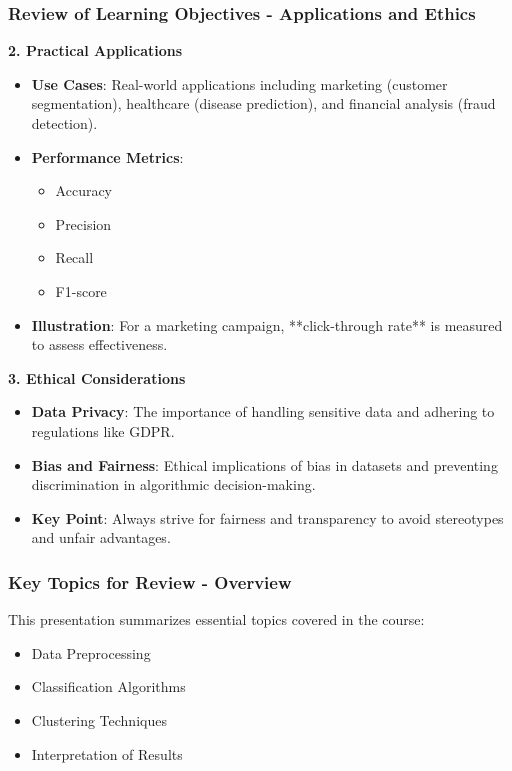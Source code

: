 \documentclass{beamer}
\begin{document}
\begin{frame}[fragile]
    \frametitle{Review of Learning Objectives - Applications and Ethics}
    \textbf{2. Practical Applications}
    \begin{itemize}
        \item \textbf{Use Cases}: Real-world applications including marketing (customer segmentation), healthcare (disease prediction), and financial analysis (fraud detection).
        \item \textbf{Performance Metrics}:
            \begin{itemize}
                \item Accuracy
                \item Precision
                \item Recall
                \item F1-score
            \end{itemize}
        \item \textbf{Illustration}: For a marketing campaign, **click-through rate** is measured to assess effectiveness.
    \end{itemize}
    
    \textbf{3. Ethical Considerations}
    \begin{itemize}
        \item \textbf{Data Privacy}: The importance of handling sensitive data and adhering to regulations like GDPR.
        \item \textbf{Bias and Fairness}: Ethical implications of bias in datasets and preventing discrimination in algorithmic decision-making.
        \item \textbf{Key Point}: Always strive for fairness and transparency to avoid stereotypes and unfair advantages.
    \end{itemize}
\end{frame}

\begin{frame}[fragile]
    \frametitle{Key Topics for Review - Overview}
    This presentation summarizes essential topics covered in the course:
    \begin{itemize}
        \item Data Preprocessing
        \item Classification Algorithms
        \item Clustering Techniques
        \item Interpretation of Results
    \end{itemize}
\end{frame}
\end{document}
